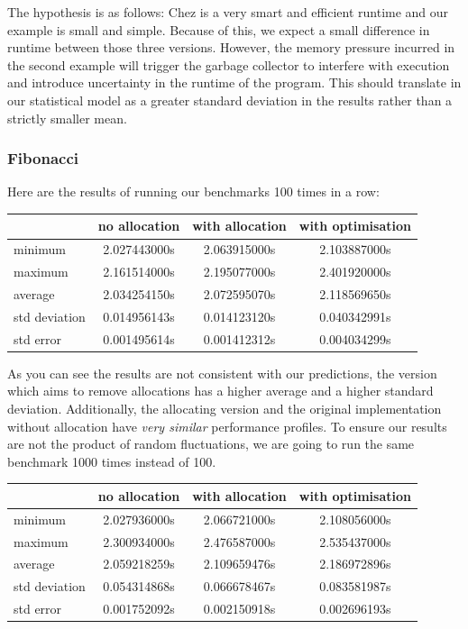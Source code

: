 \documentclass[
]{article}
\begin{document}
The hypothesis is as follows: Chez is a very smart and efficient runtime
and our example is small and simple. Because of this, we expect a small
difference in runtime between those three versions. However, the memory
pressure incurred in the second example will trigger the garbage
collector to interfere with execution and introduce uncertainty in the
runtime of the program. This should translate in our statistical model
as a greater standard deviation in the results rather than a strictly
smaller mean.

\hypertarget{fibonacci-1}{%
\subsubsection{Fibonacci}\label{fibonacci-1}}

Here are the results of running our benchmarks 100 times in a row:

\begin{tabular}{ l | c c c }
          & no allocation & with allocation & with optimisation\\
\hline 
  minimum       & 2.027443000s & 2.063915000s & 2.103887000s \\
  maximum       & 2.161514000s & 2.195077000s & 2.401920000s \\ 
  average       & 2.034254150s & 2.072595070s & 2.118569650s \\
  std deviation & 0.014956143s & 0.014123120s & 0.040342991s \\
  std error     & 0.001495614s & 0.001412312s & 0.004034299s \\
\end{tabular}

As you can see the results are not consistent with our predictions, the
version which aims to remove allocations has a higher average and a
higher standard deviation. Additionally, the allocating version and the
original implementation without allocation have \emph{very similar}
performance profiles. To ensure our results are not the product of
random fluctuations, we are going to run the same benchmark 1000 times
instead of 100.

\begin{tabular}{ l | c c c }
          & no allocation & with allocation & with optimisation\\
\hline 
  minimum       & 2.027936000s & 2.066721000s & 2.108056000s \\
  maximum       & 2.300934000s & 2.476587000s & 2.535437000s \\ 
  average       & 2.059218259s & 2.109659476s & 2.186972896s \\
  std deviation & 0.054314868s & 0.066678467s & 0.083581987s \\
  std error     & 0.001752092s & 0.002150918s & 0.002696193s \\
\end{tabular}
\end{document}
